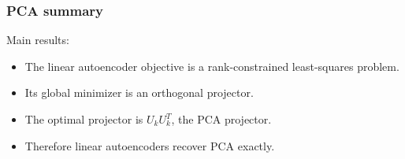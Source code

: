 \documentclass{beamer}
\begin{document}
\begin{frame}
\frametitle{PCA summary}

\begin{block}{Main results: }
\begin{itemize}
\item The linear autoencoder objective is a rank-constrained least-squares problem.

\item Its global minimizer is an orthogonal projector.

\item The optimal projector is \(U_kU_k^T\), the PCA projector.

\item Therefore linear autoencoders recover PCA exactly.
\end{itemize}

\noindent
\end{block}
\end{frame}
\end{document}

